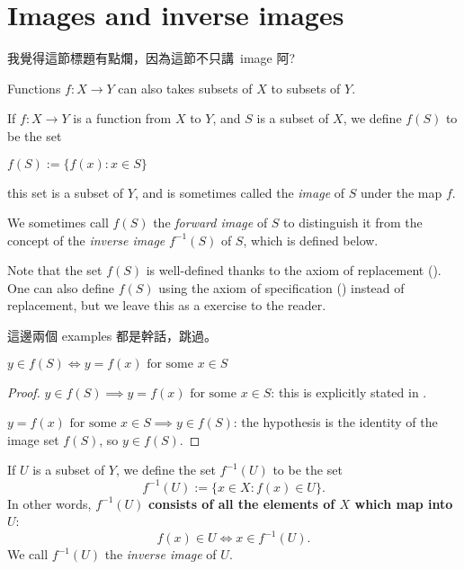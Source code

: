 \section{Images and inverse images} \label{sec 3.4}

\begin{note}
我覺得這節標題有點爛，因為這節不只講\ image 阿?
\end{note}

Functions \(f : X \rightarrow Y\) can also takes subsets of \(X\) to subsets of \(Y\).

\begin{definition}  \label{def 3.4.1}
If \(f : X \rightarrow Y\) is a function from \(X\) to \(Y\), and \(S\) is a subset of \(X\), we define \(f(S)\) to be the set
\begin{center}
    \(f(S) := \{ f(x): x \in S \} \)
\end{center}
this set is a subset of \(Y\), and is sometimes called the \emph{image} of \(S\) under the map \(f\).
\end{definition}

We sometimes call \(f(S)\) the \emph{forward image} of \(S\) to distinguish it from the concept of the \emph{inverse image} \(f^{-1}(S)\) of \(S\), which is defined below.

Note that the set \(f(S)\) is well-defined thanks to the axiom of replacement (). One can also define \(f(S)\) using the axiom of specification () instead of replacement, but we leave this as a
exercise to the reader.

\begin{note}
這邊兩個 examples 都是幹話，跳過。
\end{note}

\begin{additional corollary}
\(y \in f(S) \iff y = f(x) \text{\ for some\ } x \in S\)
\end{additional corollary}

\begin{proof}

\(y \in f(S) \implies y = f(x) \text{\ for some\ } x \in S\): this is explicitly stated in .

\(y = f(x) \text{\ for some\ } x \in S \implies y \in f(S)\): the hypothesis is the identity of the image set \(f(S)\), so \(y \in f(S)\).
\end{proof}

\setcounter{theorem}{3}
\begin{definition} \label{def 3.4.4}
If \(U\) is a subset of \(Y\), we define the set \(f^{-1}(U)\) to be the set
\[
    f^{-1}(U) := \{x \in X : f(x) \in U\}.
\]
In other words, \(f^{-1}(U)\) \textbf{consists of all the elements of \(X\) which map into \(U\)}:
\[
    f(x) \in U \iff x \in f^{-1}(U).
\]
We call \(f^{-1}(U)\) the \emph{inverse image} of \(U\).
\end{definition}

